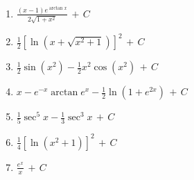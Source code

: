 \documentclass[12pt, letterpaper]{article}
\newcommand{\CC}{\,+\,C}
\begin{document}
\begin{enumerate}[leftmargin=*, label=\textbf{\arabic*.}]
  \item $\frac{(x-1)e^{\arctan x}}{2\sqrt{1+x^2}} \CC$
  \item $\frac{1}{2}[\ln(x + \sqrt{x^2+1})]^2 \CC$
  \item $\frac{1}{2}\sin(x^2) - \frac{1}{2}x^2\cos(x^2) \CC$
  \item $x - e^{-x}\arctan e^x - \frac{1}{2}\ln(1+e^{2x}) \CC$
  \item $\frac{1}{5}\sec^5 x - \frac{1}{3}\sec^3 x \CC$
  \item $\frac{1}{4}[\ln(x^2+1)]^2 \CC$
  \item $\frac{e^x}{x} \CC$
\end{enumerate}

\fi
\end{document}
